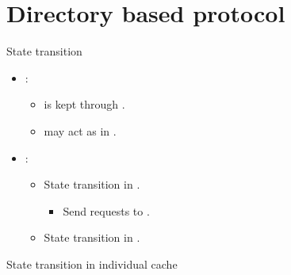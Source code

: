 \section{Directory based protocol}

\begin{frame}[t]{State transition}
\begin{itemize}
  \item {}:
    \begin{itemize}
      \item {} is kept through .
      \item {} may act as  in .
    \end{itemize}

  \item {}:
    \begin{itemize}
      \item State transition in .
        \begin{itemize}
          \item Send requests to .
        \end{itemize}
      \item State transition in .
    \end{itemize}
\end{itemize}
\end{frame}

\begin{frame}[t,shrink=10]{State transition in individual cache}
\makebox[\textwidth][c]{

}
\end{frame}

